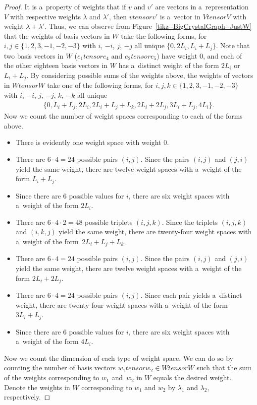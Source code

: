 \documentclass[10pt,a4paper]{amsart}
\numberwithin{equation}{section}
\theoremstyle{definition}
\def\otimes{ tensor }
\begin{document}
\begin{proof}
 It is a~property of weights that if $v$ and $v'$ are vectors in a~representation $V$ with respective weights $\lambda$ and $\lambda'$, then $v \otimes v'$ is a~vector in $V \otimes V$ with weight $\lambda + \lambda'$. Thus, we can observe from Figure~\ref{tikz--BigCrystalGraph--JustW} that the weights of basis vectors in $W$ take the following forms, for~${i,j \in \{1,2,3,-1,-2,-3\}}$ with $i$, $-i$, $j$, $-j$ all unique $
 \{0,2L_i,L_i+L_j\}$.
 Note that two basis vectors in $W$ ($e_1 \otimes e_4$ and $e_2 \otimes e_5$) have weight $0$, and each of the other eighteen basis vectors in $W$ has a~distinct weight of the form $2L_i$ or $L_i+L_j$. By considering possible sums of the weights above, the weights of vectors in $W \otimes W$ take one of the following forms, for $i,j,k \in \{1,2,3,-1,-2,-3\}$ with $i$, $-i$, $j$, $-j$, $k$, $-k$ all unique
 \begin{align*}
 \{0,L_i + L_j,2L_i,2L_i + L_j + L_k,2L_i + 2L_j,3L_i + L_j,4L_i\}.
 \end{align*}
 Now we count the number of weight spaces corresponding to each of the forms above.
 \begin{itemize}\itemsep=0pt
 \item There is evidently one weight space with weight $0$.
 \item There are $6 \cdot 4 = 24$ possible pairs $(i,j)$. Since the pairs $(i,j)$ and $(j,i)$ yield the same weight, there are twelve weight spaces with a~weight of the form $L_i + L_j$.
 \item Since there are $6$ possible values for $i$, there are six weight spaces with a~weight of the form $2L_i$.
 \item There are $6 \cdot 4 \cdot 2 = 48$ possible triplets $(i,j,k)$. Since the triplets $(i,j,k)$ and $(i,k,j)$ yield the same weight, there are twenty-four weight spaces with a~weight of the form~${2L_i + L_j + L_k}$.
 \item There are $6 \cdot 4 = 24$ possible pairs $(i,j)$. Since the pairs $(i,j)$ and $(j,i)$ yield the same weight, there are twelve weight spaces with a~weight of the form $2L_i + 2L_j$.
 \item There are $6 \cdot 4 = 24$ possible pairs $(i,j)$. Since each pair yields a~distinct weight, there are twenty-four weight spaces with a~weight of the form $3L_i + L_j$.
 \item Since there are $6$ possible values for $i$, there are six weight spaces with a~weight of the form $4L_i$.
 \end{itemize}
 Now we count the dimension of each type of weight space. We can do so by counting the number of basis vectors $w_1 \otimes w_2 \in W \otimes W$ such that the sum of the weights corresponding to $w_1$ and~$w_2$ in $W$ equals the desired weight. Denote the weights in $W$ corresponding to $w_1$ and $w_2$ by $\lambda_1$ and $\lambda_2$, respectively.

\end{proof}
\end{document}
